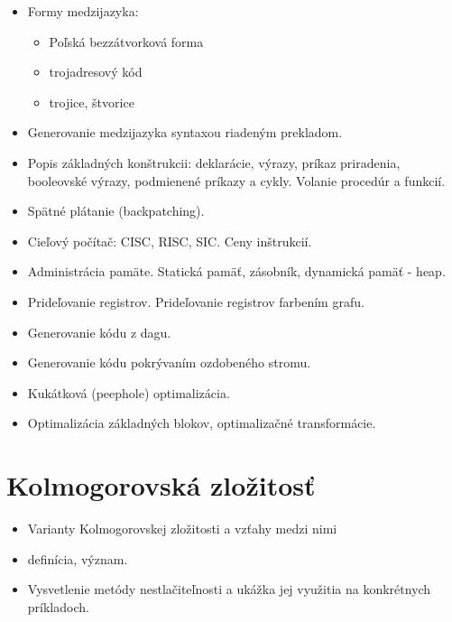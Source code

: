 \documentclass[a4paper]{report}
\begin{document}
\begin{zadanie}
\begin{itemize}
 \item Formy medzijazyka:
 \begin{itemize}
  \item Poľská bezzátvorková forma
  \item trojadresový kód
  \item trojice, štvorice
 \end{itemize}
 \item Generovanie medzijazyka syntaxou riadeným prekladom.
 \item Popis základných konštrukcii: deklarácie, výrazy, príkaz priradenia, booleovské výrazy, podmienené príkazy a cykly. Volanie procedúr a funkcií.
 \item Spätné plátanie (backpatching).
\end{itemize}
\end{zadanie}

\begin{zadanie}
\begin{itemize}
 \item Cieľový počítač: CISC, RISC, SIC. Ceny inštrukcií.
 \item Administrácia pamäte. Statická pamäť, zásobník, dynamická pamäť - heap.
 \item Prideľovanie registrov. Prideľovanie registrov farbením grafu.
 \item Generovanie kódu z dagu.
 \item Generovanie kódu pokrývaním ozdobeného stromu.
\end{itemize}
\end{zadanie}

\begin{zadanie}
\begin{itemize}
 \item Kukátková (peephole) optimalizácia.
 \item Optimalizácia základných blokov, optimalizačné transformácie.
\end{itemize}
\end{zadanie}

\chapter{Kolmogorovská zložitosť}

\begin{zadanie}
\begin{itemize}
 \item Varianty Kolmogorovskej zložitosti a vzťahy medzi nimi
\end{itemize}
\end{zadanie}

\begin{zadanie}
\begin{itemize}
 \item definícia, význam.
 \item Vysvetlenie metódy nestlačiteľnosti a ukážka jej využitia na konkrétnych príkladoch.
\end{itemize}
\end{zadanie}
\end{document}
